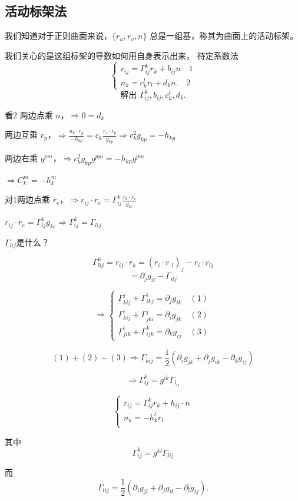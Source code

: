 \documentclass[lang=cn,10pt,thmcnt=section]{elegantbook}
\begin{document}
\subsection{活动标架法}
我们知道对于正则曲面来说，$\{r_u, r_v, n\}$ 总是一组基，称其为曲面上的活动标架。

我们关心的是这组标架的导数如何用自身表示出来，
待定系数法
\[
\begin{cases}
r_{ij} = \Gamma_{ij}^k r_k + b_{ij} n \quad 1\\
n_k = c_k^l r_l + d_k n.\quad 2
\end{cases}
\]
\[
\text{解出 } \Gamma_{ij}^k, b_{ij}, c_k^l, d_k.
\]

看2 两边点乘 $n$，$\Rightarrow 0 = d_k$

两边互乘 $r_p$，$\Rightarrow \frac{n_k \cdot r_p}{-h_{kp}} = c_k \frac{r_e \cdot r_p}{g_{kp}} \Rightarrow c_k^2 g_{kp} = -h_{kp}$

两边右乘 $g^{pm}$，$\Rightarrow c_k^2 g_{kp} g^{pm} = -h_{kp} g^{pm}$

$\Rightarrow C_k^m = -h_k^m$

对1两边点乘 $r_e$，$\Rightarrow r_{ij} \cdot r_e = \Gamma_{ij}^k \frac{r_k \cdot r_e}{g_{ke}}$

$r_{ij} \cdot r_e = \Gamma_{ij}^k g_{ke} \Rightarrow \Gamma_{ij}^k = \Gamma_{lij}$

$\Gamma_{lij} $是什么？

\[
    \Gamma^{k}_{lij}  = r_{ij} \cdot r_k = (r_i \cdot r_{,l})_j - r_i \cdot r_{lj}
\]
\[
= \partial_j g_{il} - \Gamma_{ilj}
\]

\[
\Rightarrow
\begin{cases}
\Gamma_{kij}^j + \Gamma_{ikj}^i = \partial_j g_{ik} \quad (1) \\
\Gamma_{kij}^i + \Gamma_{jki}^j = \partial_i g_{jk} \quad (2) \\
\Gamma_{jik}^i + \Gamma_{ijk}^k = \partial_k g_{ij} \quad (3)
\end{cases}
\]

\[
(1) + (2) - (3) \Rightarrow \Gamma_{kij}  = \frac{1}{2} (\partial_i g_{jk} + \partial_j g_{ik} - \partial_k g_{ij})
\]

\[
\Rightarrow \Gamma^k_{ij} = g^{ik} \Gamma_{l_{ij}}
\]

\begin{proposition}

\[
\left\{
\begin{array}{l}
r_{ij} = \Gamma_{ij}^k r_k + h_{ij} \cdot n   \\
n_k = - h_k^l r_l \\
\end{array}
\right.
\]

其中
\[
\Gamma_{ij}^k = g^{kl} \Gamma_{lij}
\]

而
\[
\Gamma_{lij} = \frac{1}{2} (\partial_i g_{jl} + \partial_j g_{il} - \partial_l g_{ij}).
\]

\end{proposition}
\end{document}
